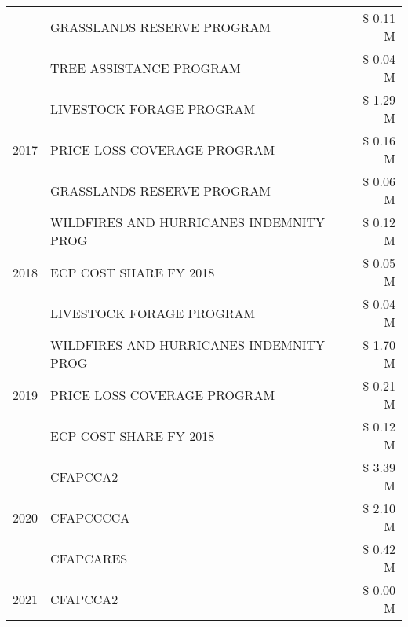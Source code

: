 \begin{tabular}{llr}
 & GRASSLANDS RESERVE PROGRAM                    & \$ 0.11 M \\
 & TREE ASSISTANCE PROGRAM                       & \$ 0.04 M \\
\cline{1-3}
\multirow[t]{3}{*}{2017} & LIVESTOCK FORAGE PROGRAM & \$ 1.29 M \\
 & PRICE LOSS COVERAGE PROGRAM & \$ 0.16 M \\
 & GRASSLANDS RESERVE PROGRAM & \$ 0.06 M \\
\cline{1-3}
\multirow[t]{3}{*}{2018} & WILDFIRES AND HURRICANES INDEMNITY PROG & \$ 0.12 M \\
 & ECP COST SHARE FY 2018 & \$ 0.05 M \\
 & LIVESTOCK FORAGE PROGRAM & \$ 0.04 M \\
\cline{1-3}
\multirow[t]{3}{*}{2019} & WILDFIRES AND HURRICANES INDEMNITY PROG & \$ 1.70 M \\
 & PRICE LOSS COVERAGE PROGRAM & \$ 0.21 M \\
 & ECP COST SHARE FY 2018 & \$ 0.12 M \\
\cline{1-3}
\multirow[t]{3}{*}{2020} & CFAPCCA2 & \$ 3.39 M \\
 & CFAPCCCCA & \$ 2.10 M \\
 & CFAPCARES & \$ 0.42 M \\
\cline{1-3}
2021 & CFAPCCA2 & \$ 0.00 M \\
\cline{1-3}
\bottomrule
\end{tabular}
